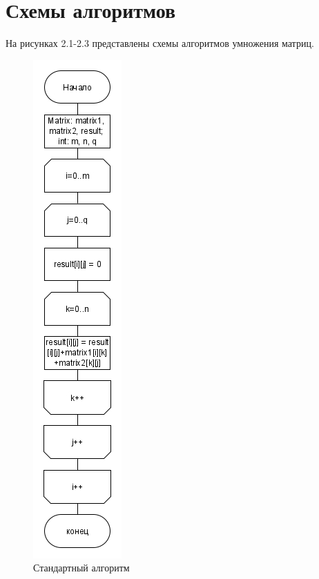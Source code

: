 \section{Схемы алгоритмов}
\label{sec:schemes}
На рисунках 2.1-2.3 представлены схемы алгоритмов умножения матриц.
\begin{figure}[H]
	\centering
	\includegraphics[height=0.7\textheight]{src/standard}
	\caption{Стандартный алгоритм}
	\label{fig:standard}
\end{figure}
